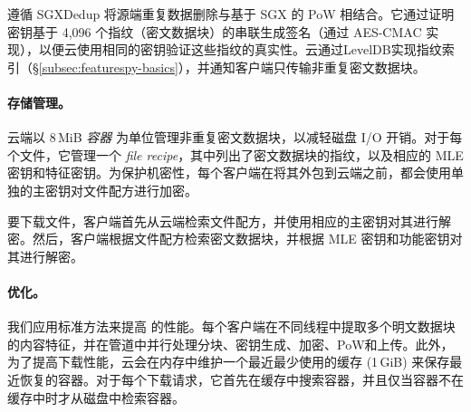\prototype 遵循 SGXDedup 将源端重复数据删除与基于 SGX 的 PoW 相结合。它通过证明密钥基于 4,096 个指纹（密文数据块）的串联生成签名（通过 AES-CMAC 实现），以便云使用相同的密钥验证这些指纹的真实性。云通过LevelDB\cite{leveldb}实现指纹索引（\S\ref{subsec:featurespy-basics}），并通知客户端只传输非重复密文数据块。

\paragraph*{存储管理。}
云端以 8\,MiB {\em 容器} 为单位管理非重复密文数据块，以减轻磁盘 I/O 开销。对于每个文件，它管理一个 {\em file recipe}，其中列出了密文数据块的指纹，以及相应的 MLE 密钥和特征密钥。为保护机密性，每个客户端在将其外包到云端之前，都会使用单独的主密钥对文件配方进行加密。

要下载文件，客户端首先从云端检索文件配方，并使用相应的主密钥对其进行解密。然后，客户端根据文件配方检索密文数据块，并根据 MLE 密钥和功能密钥对其进行解密。

\paragraph*{优化。}
我们应用标准方法来提高 \prototype 的性能。每个客户端在不同线程中提取多个明文数据块的内容特征，并在管道中并行处理分块、密钥生成、加密、PoW和上传。此外，为了提高下载性能，云会在内存中维护一个最近最少使用的缓存 (1\,GiB) 来保存最近恢复的容器。对于每个下载请求，它首先在缓存中搜索容器，并且仅当容器不在缓存中时才从磁盘中检索容器。
